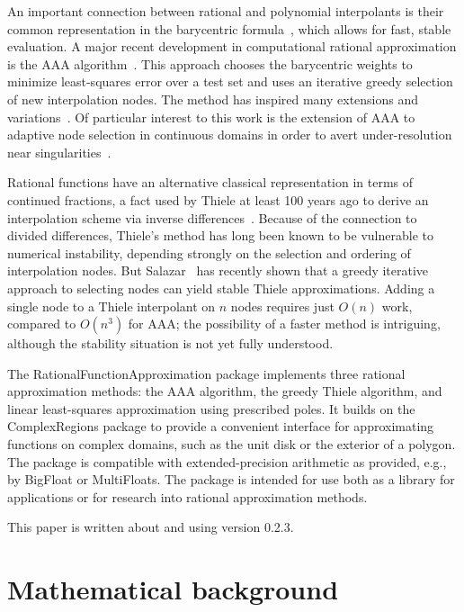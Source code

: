\documentclass{juliacon}
\begin{document}
An important connection between rational and polynomial interpolants is their common representation in the barycentric formula~\cite{berrutBarycentricLagrange2004,schneiderNewAspects1986}, which allows for fast, stable evaluation. A major recent development in computational rational approximation is the AAA algorithm~\cite{nakatsukasaAAAAlgorithm2018}. This approach chooses the barycentric weights to minimize least-squares error over a test set and uses an iterative greedy selection of new interpolation nodes. The method has inspired many extensions and variations~\cite{filipRationalMinimax2018,hochmanFastAAAFast2017,nakatsukasaAlgorithmReal2020,wilberDatadrivenAlgorithms2022}. Of particular interest to this work is the extension of AAA to adaptive node selection in continuous domains in order to avert under-resolution near singularities~\cite{driscollAAARational2024}.

Rational functions have an alternative classical representation in terms of continued fractions, a fact used by Thiele at least 100 years ago to derive an interpolation scheme via inverse differences~\cite{milne-thompsonCalculusFinite1933}. Because of the connection to divided differences, Thiele's method has long been known to be vulnerable to numerical instability, depending strongly on the selection and ordering of interpolation nodes. But Salazar~\cite{celisAdaptiveThiele2023,celisNumericalContinued2024} has recently shown that a greedy iterative approach to selecting nodes can yield stable Thiele approximations. Adding a single node to a Thiele interpolant on $n$ nodes requires just $O(n)$ work, compared to $O(n^3)$ for AAA; the possibility of a faster method is intriguing, although the stability situation is not yet fully understood.

The \textsf{RationalFunctionApproximation} package implements three rational approximation methods: the AAA algorithm, the greedy Thiele algorithm, and linear least-squares approximation using prescribed poles. It builds on the \textsf{ComplexRegions} package to provide a convenient interface for approximating functions on complex domains, such as the unit disk or the exterior of a polygon. The package is compatible with extended-precision arithmetic as provided, e.g., by \textsf{BigFloat} or \textsf{MultiFloats}. The package is intended for use both as a library for applications or for research into rational approximation methods.

This paper is written about and using version 0.2.3. 

\section{Mathematical background}
\label{sec:math}
\end{document}
